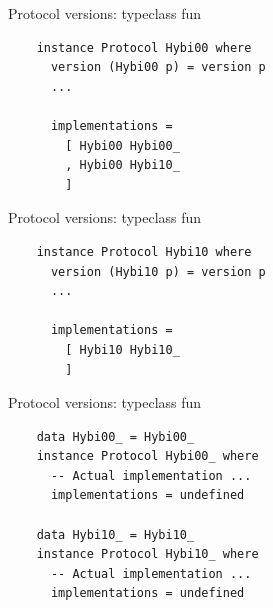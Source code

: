 \documentclass[20pt]{beamer}
\begin{document}
\begin{frame}[fragile]{Protocol versions: typeclass fun}
    \begin{lstlisting}
    instance Protocol Hybi00 where
      version (Hybi00 p) = version p
      ...

      implementations =
        [ Hybi00 Hybi00_
        , Hybi00 Hybi10_
        ]
    \end{lstlisting}
\end{frame}

\begin{frame}[fragile]{Protocol versions: typeclass fun}
    \begin{lstlisting}
    instance Protocol Hybi10 where
      version (Hybi10 p) = version p
      ...

      implementations =
        [ Hybi10 Hybi10_
        ]
    \end{lstlisting}
\end{frame}

\begin{frame}[fragile]{Protocol versions: typeclass fun}
    \begin{lstlisting}
    data Hybi00_ = Hybi00_
    instance Protocol Hybi00_ where
      -- Actual implementation ...
      implementations = undefined

    data Hybi10_ = Hybi10_
    instance Protocol Hybi10_ where
      -- Actual implementation ...
      implementations = undefined
    \end{lstlisting}
\end{frame}




\end{document}
